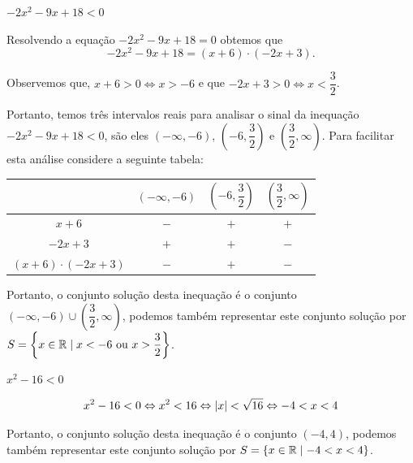  \begin{exem}
 $-2x^2- 9x + 18 < 0$

  Resolvendo a equação $-2x^2- 9x + 18 = 0$ obtemos que
\begin{equation}
-2x^2- 9x + 18 = (x+6) \cdot (-2x + 3) . 
\end{equation}
 
 Observemos que, $x+6> 0 \Leftrightarrow x> -6$ e que $-2x + 3> 0 \Leftrightarrow x < \dfrac{3}{2}$. 
 
 Portanto, temos três intervalos reais para analisar o sinal da inequação $-2x^2- 9x + 18 < 0$, são eles $(-\infty, -6)$, $\left(-6, \dfrac{3}{2}\right)$ e $\left(\dfrac{3}{2}, \infty\right)$. Para facilitar esta análise considere a seguinte tabela:
 
 \begin{table}[H]
 \centering
 \begin{tabular}{|c|c|c|c|} \hline
 \rowcolor{cinza}
    & $(-\infty, -6)$ & $\left(-6, \dfrac{3}{2} \right)$ & $\left(\dfrac{3}{2}, \infty \right)$ \\ \hline
                $x+6$ & $-$             & $+$       & $+$ \\ \hline
            $-2x + 3$ & $+$             & $+$       & $-$ \\ \hline
$(x+6) \cdot (-2x + 3)$ & $-$             & $+$       & $-$ \\ \hline
 \end{tabular}
 \end{table}
 
 Portanto, o conjunto solução desta inequação é o conjunto $(-\infty, -6) \cup \left(\dfrac{3}{2}, \infty \right)$, podemos também representar este conjunto solução por $S= \left\{ x \in \mathbb{R} \mid x < -6 \text{ ou } x > \dfrac{3}{2} \right\}$.
 \end{exem} 
 
 \begin{exem}
 $x^2 - 16 < 0$
 
 \begin{eqnarray*}
 x^2 - 16 < 0 \Leftrightarrow x^2 < 16 \Leftrightarrow \left|x\right| < \sqrt{16} \Leftrightarrow -4 < x < 4
 \end{eqnarray*}
 
Portanto, o conjunto solução desta inequação é o conjunto $(-4, 4)$, podemos também representar este conjunto solução por $S= \left\{ x \in \mathbb{R} \mid -4 < x < 4 \right\}$. 
 \end{exem}
 

